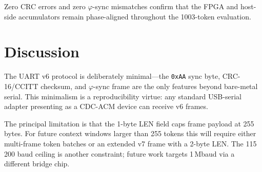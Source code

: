Zero CRC errors and zero $\varphi$-sync mismatches confirm that the FPGA and host-side accumulators remain phase-aligned throughout the 1003-token evaluation.

\section{Discussion}

The UART v6 protocol is deliberately minimal---the \texttt{0xAA} sync byte, CRC-16/CCITT checksum, and $\varphi$-sync frame are the only features beyond bare-metal serial. This minimalism is a reproducibility virtue: any standard USB-serial adapter presenting as a CDC-ACM device can receive v6 frames.

The principal limitation is that the 1-byte LEN field caps frame payload at 255 bytes. For future context windows larger than 255 tokens this will require either multi-frame token batches or an extended v7 frame with a 2-byte LEN. The 115\,200 baud ceiling is another constraint; future work targets 1\,Mbaud via a different bridge chip.
